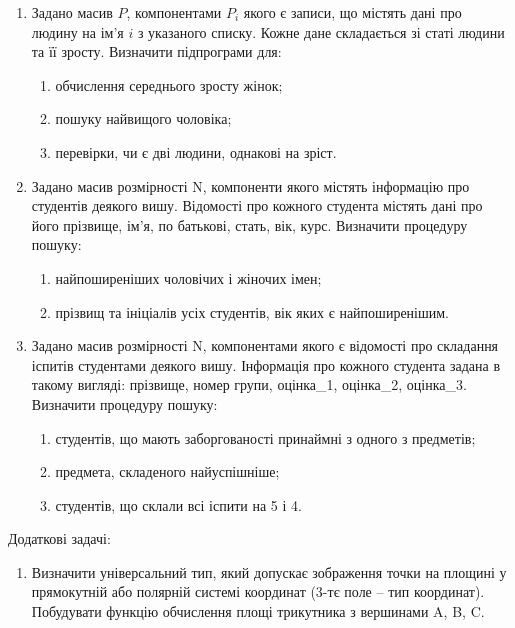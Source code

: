 \documentclass[]{article}
\makeatletter
\newcommand{\xslalph}[1]{\expandafter\@xslalph\csname c@#1\endcsname}
\newcommand{\@xslalph}[1]{%
    \ifcase#1\or а\or б\or в\or г\or д\or e\or є\or ж\or з\or i%
    \or й\or к\or л\or м\or н\or о\or п\or р\or с\or т%
    \or у\or ф\or х\or ц\or ч\or ш\or ю\or я\or аа\or бб\or вв%
    \else\@ctrerr\fi%
}
\makeatother
\begin{document}
\begin{enumerate}
\begin{enumerate}[label=\xslalph*)]
\begin{enumerate}
\begin{enumerate}[label=\xslalph*)]
\begin{enumerate}
\item
  Задано масив $P$, компонентами $P_i$ якого є записи, що містять дані про
  людину на ім'я $i$ з указаного списку. Кожне дане складається зі статі
  людини та її зросту. Визначити підпрограми для:
\begin{enumerate}[label=\xslalph*)]
\item обчислення середнього зросту жінок;
\item пошуку найвищого чоловіка;
\item перевірки, чи є дві людини, однакові на зріст.
\end{enumerate}

\item
  Задано масив розмірності N, компоненти якого містять інформацію про
  студентів деякого вишу. Відомості про кожного студента містять дані
  про його прізвище, ім'я, по батькові, стать, вік, курс. Визначити
  процедуру пошуку:
\begin{enumerate}[label=\xslalph*)]
\item найпоширеніших чоловічих і жіночих імен;
\item прізвищ та ініціалів усіх студентів, вік яких є найпоширенішим.
\end{enumerate}

\item
  Задано масив розмірності N, компонентами якого є відомості про
  складання іспитів студентами деякого вишу. Інформація про кожного
  студента задана в такому вигляді: прізвище, номер групи, оцінка\_1,
  оцінка\_2, оцінка\_3. Визначити процедуру пошуку:
\begin{enumerate}[label=\xslalph*)]
\item студентів, що мають заборгованості принаймні з одного з предметів;
\item предмета, складеного найуспішніше;
\item студентів, що склали всі іспити на 5 і 4.
\end{enumerate}

\end{enumerate}

Додаткові задачі:

\begin{enumerate}
\def\labelenumi{\arabic{enumi})}
\setcounter{enumi}{17}
\item
  Визначити універсальний тип, який допускає зображення точки на площині
  у прямокутній або полярній системі координат (3-тє поле -- тип
  координат). Побудувати функцію обчислення площі трикутника з вершинами
  A, B, C.
\end{enumerate}



\end{enumerate}
\end{enumerate}
\end{enumerate}
\end{enumerate}
\end{document}
